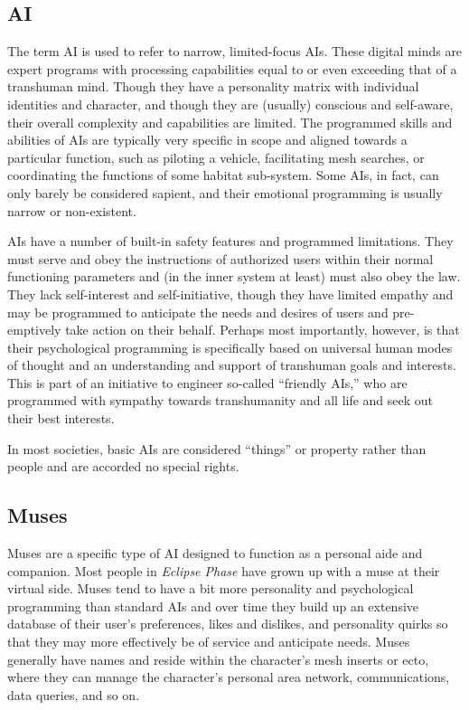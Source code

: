 \subsection{AI}

The term AI is used to refer to narrow, limited-focus 
AIs. These digital minds are expert programs with processing
capabilities equal to or even exceeding that of
a transhuman mind. Though they have a personality 
matrix with individual identities and character, and 
though they are (usually) conscious and self-aware, 
their overall complexity and capabilities are limited. 
The programmed skills and abilities of AIs are typically
very specific in scope and aligned towards a particular
function, such as piloting a vehicle, facilitating
mesh searches, or coordinating the functions of some 
habitat sub-system. Some AIs, in fact, can only barely 
be considered sapient, and their emotional programming
is usually narrow or non-existent.

AIs have a number of built-in safety features and 
programmed limitations. They must serve and obey the 
instructions of authorized users within their normal 
functioning parameters and (in the inner system at 
least) must also obey the law. They lack self-interest 
and self-initiative, though they have limited empathy 
and may be programmed to anticipate the needs and 
desires of users and pre-emptively take action on 
their behalf. Perhaps most importantly, however, is 
that their psychological programming is specifically 
based on universal human modes of thought and an 
understanding and support of transhuman goals 
and interests. This is part of an initiative to engineer 
so-called ``friendly AIs,'' who are programmed with 
sympathy towards transhumanity and all life and seek 
out their best interests.

In most societies, basic AIs are considered ``things'' 
or property rather than people and are accorded no 
special rights.

\subsection{Muses}

Muses are a specific type of AI designed to function 
as a personal aide and companion. Most people in 
\textit{Eclipse Phase} have grown up with a muse at their 
virtual side. Muses tend to have a bit more personality 
and psychological programming than standard AIs and 
over time they build up an extensive database of their 
user's preferences, likes and dislikes, and personality 
quirks so that they may more effectively be of service 
and anticipate needs. Muses generally have names 
and reside within the character's mesh inserts or ecto, 
where they can manage the character's personal area 
network, communications, data queries, and so on.

